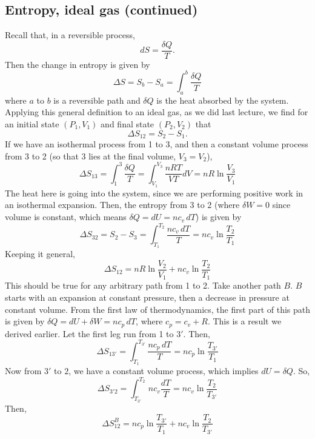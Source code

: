 \documentclass{report}
\numberwithin{equation}{section}
\begin{document}
\subsection{Entropy, ideal gas (continued)}
Recall that, in a reversible process,
\begin{equation*}
    dS = \frac{\delta Q}{T}.
\end{equation*}
Then the change in entropy is given by
\begin{equation*}
    \Delta S = S_b - S_a = \int^b_a \frac{\delta Q}{T}
\end{equation*}
where $a$ to $b$ is a reversible path and $\delta Q$ is the heat absorbed by the system. Applying this general definition to an ideal gas, as we did last lecture, we find for an initial state $(P_1,V_1)$ and final state $(P_2,V_2)$ that
\begin{equation*}
    \Delta S_{12} = S_2 - S_1.
\end{equation*}
If we have an isothermal process from 1 to 3, and then a constant volume process from 3 to 2 (so that 3 lies at the final volume, $V_3 = V_2$),
\begin{equation*}
    \Delta S_{13} = \int^3_1 \frac{\delta Q}{T} = \int^{V_3}_{V_1} \frac{nRT}{VT}dV = nR \ln\frac{V_3}{V_1}
\end{equation*}
The heat here is going into the system, since we are performing positive work in an isothermal expansion. Then, the entropy from 3 to 2 (where $\delta W = 0$ since volume is constant, which means $\delta Q = dU = nc_v\, dT$) is given by
\begin{equation*}
    \Delta S_{32} = S_2 - S_3 = \int^{T_2}_{T_1}\frac{nc_v\, dT}{T} = nc_v\ln \frac{T_2}{T_1}
\end{equation*}
Keeping it general,
\begin{equation*}
    \Delta S_{12} = nR\ln\frac{V_2}{V_1}+nc_v\ln\frac{T_2}{T_1}
\end{equation*}
This should be true for any arbitrary path from 1 to 2. Take another path $B$. $B$ starts with an expansion at constant pressure, then a decrease in pressure at constant volume. From the first law of thermodynamics, the first part of this
path is given by $\delta Q = dU + \delta W = nc_p\, dT$, where $c_p = c_v + R$. This is a result we derived earlier. Let the first leg run from 1 to $3'$. Then,
\begin{equation*}
    \Delta S_{13'} = \int^{T_{3'}}_{T_1}\frac{nc_p\, dT}{T}= nc_p\ln\frac{T_{3'}}{T_1}
\end{equation*}
Now from $3'$ to $2$, we have a constant volume process, which implies $dU = \delta Q$. So,
\begin{equation*}
    \Delta S_{3'2} = \int^{T_2}_{T_{3'}}nc_v\frac{dT}{T} = nc_v\ln\frac{T_2}{T_{3'}}
\end{equation*}
Then,
\begin{equation*}
    \Delta S^B_{12} = nc_p\ln\frac{T_{3'}}{T_1} + nc_v\ln\frac{T_2}{T_{3'}}
\end{equation*}
\end{document}
